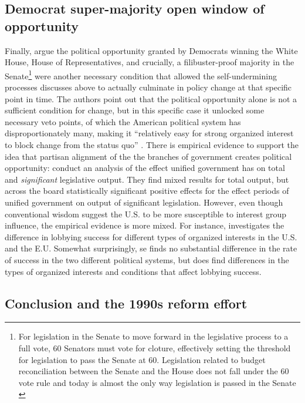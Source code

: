\documentclass[11pt]{article}
\begin{document}
\subsection*{Democrat super-majority open window of opportunity}
Finally, \textcite[][]{Jacobs2014} argue the political opportunity granted by Democrats winning the White House, House of Representatives, and crucially, a filibuster-proof majority in the Senate\footnote{For legislation in the Senate to move forward in the legislative process to a full vote, 60 Senators must vote for cloture, effectively setting the threshold for legislation to pass the Senate at 60. Legislation related to budget reconciliation between the Senate and the House does not fall under the 60 vote rule and today is almost the only way legislation is passed in the Senate \parencite[][]{Lau2021}} were another necessary condition that allowed the self-undermining processes discusses above to actually culminate in policy change at that specific point in time. The authors point out that the political opportunity alone is not a sufficient condition for change, but in this specific case it unlocked some necessary veto points, of which the American political system has disproportionately many, making it \enquote{relatively easy for strong organized interest to block change from the status quo} \parencite[][p. 453]{Jacobs2014}. There is empirical evidence to support the idea that partisan alignment of the the branches of government creates political opportunity: \textcite[][]{Ansolabehere2017} conduct an analysis of the effect unified government has on total and \textit{significant} legislative output. They find mixed results for total output, but across the board statistically significant positive effects for the effect periods of unified government on output of significant legislation. However, even though conventional wisdom suggest the U.S. to be more susceptible to interest group influence, the empirical evidence is more mixed. For instance, \textcite[][]{Mahoney2007} investigates the difference in lobbying success for different types of organized interests in the U.S. and the E.U. Somewhat surprisingly, se finds no substantial difference in the rate of success in the two different political systems, but does find differences in the types of organized interests and conditions that affect lobbying success.

\subsection*{Conclusion and the 1990s reform effort}
\end{document}
